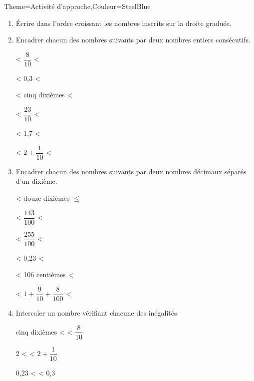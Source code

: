 \begin{Maquette}[Cours]{Theme={Activité d'approche},Couleur={SteelBlue}}
\begin{AActivite}

            \begin{enumerate}[resume]
                  \item Écrire dans l'ordre croissant les nombres inscrits sur la droite graduée. \par            
                     \pointilles \par
                     \pointilles
                  \item Encadrer chacun des nombres suivants par deux nombres entiers consécutifs.
                     \begin{multicols}{3}  
                        \pointilles{} < $\dfrac{8}{10}$ < \pointilles \par
                        \pointilles{} < 0,3 < \pointilles \par
                        \pointilles{} < {\small cinq dixièmes} < \pointilles \par
                        \pointilles{} < $\dfrac{23}{10}$ < \pointilles \par
                        \pointilles{} < 1,7 < \pointilles \par
                        \pointilles{} < $2+\dfrac{1}{10}$ < \pointilles
                     \end{multicols}
                  \item Encadrer chacun des nombres suivants par deux nombres décimaux séparés d'un dixième.
                     {\baselineskip=8mm
                     \begin{multicols}{3}
                        \pointilles{} < douze dixièmes $\leq$ \pointilles \par
                        \pointilles{} < $\dfrac{143}{100}$ < \pointilles \par
                        \pointilles{} < $\dfrac{255}{100}$ < \pointilles \par
                        \pointilles{} < 0,23 < \pointilles \par
                        \pointilles{} < {\small 106 centièmes} < \pointilles \par
                        \pointilles{} < $1+\dfrac{9}{10}+\dfrac{8}{100}$ < \pointilles \par
                     \end{multicols}}
                  \item Intercaler un nombre vérifiant chacune des inégalités.
                     \begin{multicols}{3}
                        {\small cinq dixièmes} < \pointilles{} < $\dfrac{8}{10}$ \par
                        2 < \pointilles{} < $2+\dfrac{1}{10}$ \par
                        0,23 < \pointilles{} < 0,3
                     \end{multicols}
            \end{enumerate}


\end{AActivite}
\end{Maquette}
